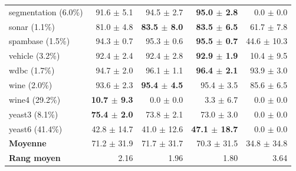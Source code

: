 \begin{table}[ht]
\begin{tabular}{lrrrr}
  segmentation (6.0\%) & 91.6 $\pm$ 5.1 & 94.5 $\pm$ 2.7 & \textbf{95.0 $\pm$ 2.8} & 0.0 $\pm$ 0.0 \\
  sonar (1.1\%) & 81.0 $\pm$ 4.8 & \textbf{83.5 $\pm$ 8.0} & \textbf{83.5 $\pm$ 6.5} & 61.7 $\pm$ 7.8 \\
  spambase (1.5\%) & 94.3 $\pm$ 0.7 & 95.3 $\pm$ 0.6 & \textbf{95.5 $\pm$ 0.7} & 44.6 $\pm$ 10.3 \\
  vehicle (3.2\%) & 92.4 $\pm$ 2.4 & 92.4 $\pm$ 2.8 & \textbf{92.9 $\pm$ 1.9} & 10.4 $\pm$ 9.5 \\
  wdbc (1.7\%) & 94.7 $\pm$ 2.0 & 96.1 $\pm$ 1.1 & \textbf{96.4 $\pm$ 2.1} & 93.9 $\pm$ 3.0 \\
  wine (2.0\%) & 93.6 $\pm$ 2.3 & \textbf{95.4 $\pm$ 4.5} & 95.4 $\pm$ 3.5 & 85.6 $\pm$ 6.5 \\
  wine4 (29.2\%) & \textbf{10.7 $\pm$ 9.3} & 0.0 $\pm$ 0.0 & 3.3 $\pm$ 6.7 & 0.0 $\pm$ 0.0 \\
  yeast3 (8.1\%) & \textbf{75.4 $\pm$ 2.0} & 73.8 $\pm$ 2.1 & 73.0 $\pm$ 3.0 & 0.0 $\pm$ 0.0 \\
  yeast6 (41.4\%) & 42.8 $\pm$ 14.7 & 41.0 $\pm$ 12.6 & \textbf{47.1 $\pm$ 18.7} & 0.0 $\pm$ 0.0 \\
\midrule
  \textbf{Moyenne} & 71.2 $\pm$ 31.9 & 71.7 $\pm$ 31.7 & 70.3 $\pm$ 31.5 & 34.8 $\pm$ 34.8 \\
  \textbf{Rang moyen} & 2.16 & 1.96 & 1.80 & 3.64 \\
\bottomrule
\end{tabular}
\end{table}